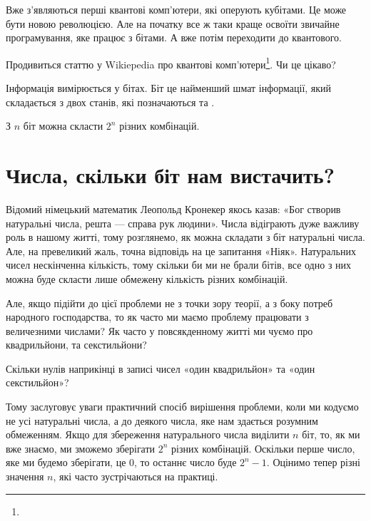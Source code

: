 Вже з'являються перші квантові комп'ютери, які оперують кубітами.
Це може бути новою революцією.
Але на початку все ж таки краще освоїти звичайне програмування, яке працює з бітами.
А вже потім переходити до квантового.

\begin{exercise}
Продивиться статтю у Wikiepedia про квантові комп'ютери\footnote{\quantumref}. Чи це цікаво?
\end{exercise}

\begin{summary}
\item Інформація вимірюється у бітах.  Біт це найменший шмат інформації, який складається з двох станів, які позначаються  та .
\item З $n$ біт можна скласти $2^n$ різних комбінацій.
\end{summary}

\section{Числа, скільки біт нам вистачить?}

Відомий німецький математик Леопольд Кронекер якось казав: «Бог створив натуральні числа, решта — справа рук людини».
Числа відіграють дуже важливу роль в нашому житті, тому розглянемо, як можна складати з біт натуральні числа.
Але, на превеликий жаль, точна відповідь на це запитання «Ніяк».
Натуральних чисел нескінченна кількість, тому скільки би ми не брали бітів, все одно з них можна буде скласти лише обмежену кількість різних комбінацій.

Але, якщо підійти до цієї проблеми не з точки зору теорії, а з боку потреб народного господарства, то як часто ми маємо проблему працювати з величезними числами?
Як часто у повсякденному житті ми чуємо про квадрильйони, та секстильйони?

\begin{exercise}
Скільки нулів наприкінці в записі чисел «один квадрильйон» та «один секстильйон»?
\end{exercise}

Тому заслуговує уваги практичний спосіб вирішення проблеми, коли ми кодуємо не усі натуральні числа, а до деякого числа, яке нам здається розумним обмеженням.
Якщо для збереження натурального числа виділити $n$ біт, то, як ми вже знаємо, ми зможемо зберігати $2^n$ різних комбінацій.
Оскільки перше число, яке ми будемо зберігати, це $0$, то останнє число буде $2^n-1$.
Оцінимо тепер різні значення $n$, які часто зустрічаються на практиці.

